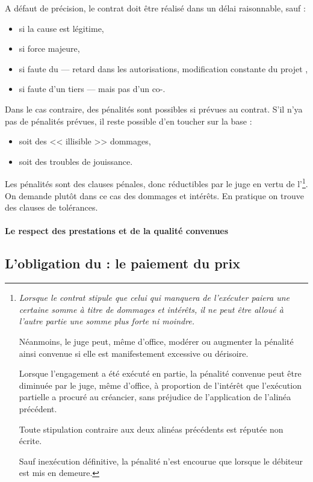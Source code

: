 				A défaut de précision, le contrat doit être réalisé dans un délai raisonnable, sauf :
				\begin{itemize}
					\item si la cause est légitime,
					\item si force majeure,
					\item si faute du \Mo --- retard dans les autorisations, modification constante du projet \etc,
					\item si faute d'un tiers --- mais pas d'un co-\lo.
				\end{itemize}
				Dans le cas contraire, des pénalités sont possibles si prévues au contrat. S'il n'ya pas de pénalités prévues, il reste possible d'en toucher sur la base :
				\begin{itemize}
					\item soit des << illisible >> dommages,
					\item soit des troubles de jouissance.
				\end{itemize}
			
			Les pénalités sont des clauses pénales, donc réductibles par le juge en vertu de l'\footnote{\itshape Lorsque le contrat stipule que celui qui manquera de l'exécuter paiera une certaine somme à titre de dommages et intérêts, il ne peut être alloué à l'autre partie une somme plus forte ni moindre.
				
				Néanmoins, le juge peut, même d'office, modérer ou augmenter la pénalité ainsi convenue si elle est manifestement excessive ou dérisoire.
				
				Lorsque l'engagement a été exécuté en partie, la pénalité convenue peut être diminuée par le juge, même d'office, à proportion de l'intérêt que l'exécution partielle a procuré au créancier, sans préjudice de l'application de l'alinéa précédent.
				
				Toute stipulation contraire aux deux alinéas précédents est réputée non écrite.
				
				Sauf inexécution définitive, la pénalité n'est encourue que lorsque le débiteur est mis en demeure.}. On demande plutôt dans ce cas des dommages et intérêts. En pratique on trouve des clauses de tolérances.
				
				\paragraph{Le respect des prestations et de la qualité convenues}
		
		\subsection[L'obligation du \Mo]{L'obligation du \Mo : le paiement du prix}
		
